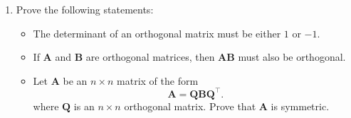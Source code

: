 \documentclass[]{book}
\providecommand{\tightlist}{%
  \setlength{\itemsep}{0pt}\setlength{\parskip}{0pt}}
\theoremstyle{definition}
\theoremstyle{definition}
\theoremstyle{definition}
\theoremstyle{remark}
\begin{document}
\begin{enumerate}
\def\labelenumi{\arabic{enumi}.}
\setcounter{enumi}{4}
\tightlist
\item
  Prove the following statements:

  \begin{itemize}
  \tightlist
  \item
    The determinant of an orthogonal matrix must be either \(1\) or \(-1\).
  \item
    If \(\boldsymbol A\) and \(\boldsymbol B\) are orthogonal matrices, then \(\boldsymbol A\boldsymbol B\) must also be orthogonal.
  \item
    Let \(\boldsymbol A\) be an \(n\times n\) matrix of the form
    \[\boldsymbol A= \boldsymbol Q\boldsymbol B\boldsymbol Q^\top.\]
    where \(\boldsymbol Q\) is an \(n\times n\) orthogonal matrix. Prove that \(\boldsymbol A\) is symmetric.
  \end{itemize}
\end{enumerate}
\end{document}
